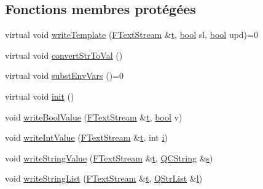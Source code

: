 \subsection*{Fonctions membres protégées}
\begin{DoxyCompactItemize}
\item 
virtual void \hyperlink{class_config_option_a4af9c041d81cc919e5aae2210087bc38}{write\+Template} (\hyperlink{class_f_text_stream}{F\+Text\+Stream} \&\hyperlink{058__bracket__recursion_8tcl_a69e959f6901827e4d8271aeaa5fba0fc}{t}, \hyperlink{qglobal_8h_a1062901a7428fdd9c7f180f5e01ea056}{bool} sl, \hyperlink{qglobal_8h_a1062901a7428fdd9c7f180f5e01ea056}{bool} upd)=0
\item 
virtual void \hyperlink{class_config_option_af1d26523f37d742316ddc4c0f9add4fc}{convert\+Str\+To\+Val} ()
\item 
virtual void \hyperlink{class_config_option_aeb6ac539f2fe79e07f2baefd5c4d89c1}{subst\+Env\+Vars} ()=0
\item 
virtual void \hyperlink{class_config_option_a1dabfad39230674fc07f5f535392fd35}{init} ()
\item 
void \hyperlink{class_config_option_a0762b14d6706667da888cd9c56c6f1e7}{write\+Bool\+Value} (\hyperlink{class_f_text_stream}{F\+Text\+Stream} \&\hyperlink{058__bracket__recursion_8tcl_a69e959f6901827e4d8271aeaa5fba0fc}{t}, \hyperlink{qglobal_8h_a1062901a7428fdd9c7f180f5e01ea056}{bool} v)
\item 
void \hyperlink{class_config_option_a759c9a9621a46b28dcedd5c22a0e271f}{write\+Int\+Value} (\hyperlink{class_f_text_stream}{F\+Text\+Stream} \&\hyperlink{058__bracket__recursion_8tcl_a69e959f6901827e4d8271aeaa5fba0fc}{t}, int \hyperlink{060__command__switch_8tcl_a8c90afd4641b25be86bd09983c3cbee0}{i})
\item 
void \hyperlink{class_config_option_a6e36e0022317d91fd50398119420ad02}{write\+String\+Value} (\hyperlink{class_f_text_stream}{F\+Text\+Stream} \&\hyperlink{058__bracket__recursion_8tcl_a69e959f6901827e4d8271aeaa5fba0fc}{t}, \hyperlink{class_q_c_string}{Q\+C\+String} \&\hyperlink{060__command__switch_8tcl_a011c73f2dbb87635a3b4206c72355f6e}{s})
\item 
void \hyperlink{class_config_option_abd1fe2acb02bd19ed4ec67b6a60ce446}{write\+String\+List} (\hyperlink{class_f_text_stream}{F\+Text\+Stream} \&\hyperlink{058__bracket__recursion_8tcl_a69e959f6901827e4d8271aeaa5fba0fc}{t}, \hyperlink{class_q_str_list}{Q\+Str\+List} \&\hyperlink{060__command__switch_8tcl_aff56f84b49947b84b2a304f51cf8e678}{l})
\end{DoxyCompactItemize}
